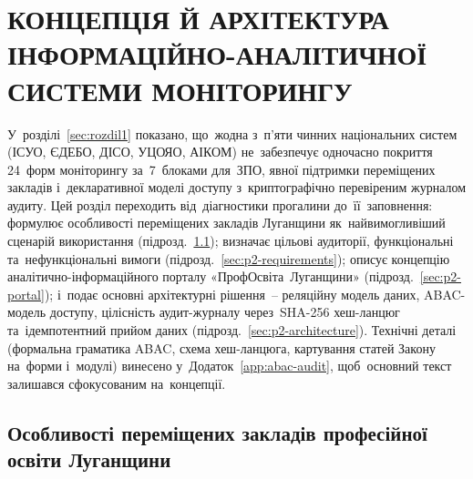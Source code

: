 %

\section{\texorpdfstring{\MakeUppercase{Концепція й архітектура інформаційно-аналітичної системи моніторингу}}{Концепція й архітектура інформаційно-аналітичної системи моніторингу}}
\label{sec:rozdil2}

У~розділі~\ref{sec:rozdil1} показано, що~жодна з~п'яти чинних національних систем (ІСУО, ЄДЕБО, ДІСО, УЦОЯО, АІКОМ) не~забезпечує одночасно покриття 24~форм моніторингу за~7~блоками для~ЗПО, явної підтримки переміщених закладів і~декларативної моделі доступу з~криптографічно перевіреним журналом аудиту. Цей розділ переходить від~діагностики прогалини до~її~заповнення: формулює особливості переміщених закладів Луганщини як~найвимогливіший сценарій використання (підрозд.~\ref{sec:p2-displaced}); визначає цільові аудиторії, функціональні та~нефункціональні вимоги (підрозд.~\ref{sec:p2-requirements}); описує концепцію аналітично-інформаційного порталу «ПрофОсвіта~Луганщини» (підрозд.~\ref{sec:p2-portal}); і~подає основні архітектурні рішення~-- реляційну модель даних, ABAC-модель доступу, цілісність аудит-журналу через~SHA-256 хеш-ланцюг та~ідемпотентний прийом даних (підрозд.~\ref{sec:p2-architecture}). Технічні деталі (формальна граматика ABAC, схема хеш-ланцюга, картування статей Закону на~форми і~модулі) винесено у~Додаток~\ref{app:abac-audit}, щоб~основний текст залишався сфокусованим на~концепції.

\subsection{Особливості переміщених закладів професійної освіти Луганщини}
\label{sec:p2-displaced}

